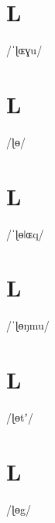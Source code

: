 \documentclass[10pt,a4paper,twoside]{book}
\begin{document}
\section*{L}

\begin{multicols}{3}
 {/ˈɭɶɣu/} {}
\end{multicols}

\section*{L}

\begin{multicols}{3}
 {/ɭɵ/} {}
\end{multicols}

\section*{L}

\begin{multicols}{3}
 {/ˈɭɵǀɶq/} {}
\end{multicols}

\section*{L}

\begin{multicols}{3}
 {/ˈɭɵŋmu/} {}
\end{multicols}

\section*{L}

\begin{multicols}{3}
 {/ɭɵtʼ/} {}
\end{multicols}

\section*{L}

\begin{multicols}{3}
 {/ɭɵg/} {}
\end{multicols}
\end{document}
